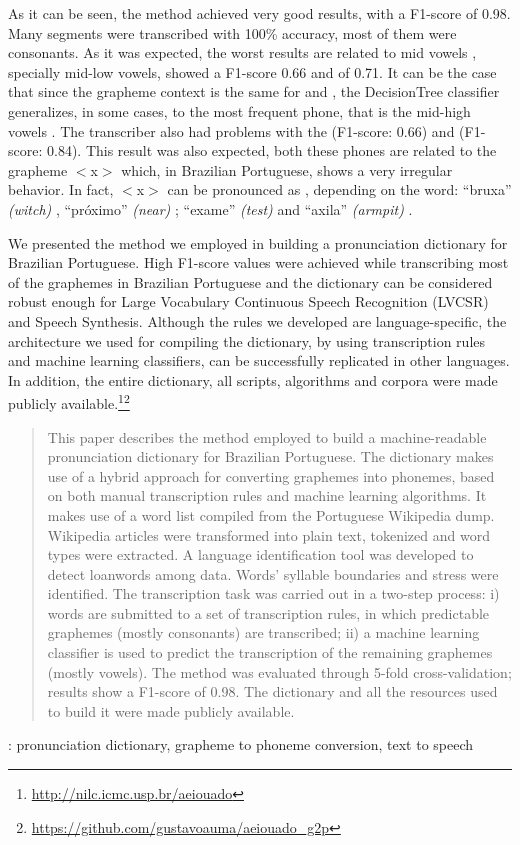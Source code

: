 As it can be seen, the method achieved very good results, with a F1-score of 0.98. Many segments were transcribed with 100\% accuracy, most of them were consonants. As it was expected, the worst results are related to mid vowels \textipa{[E, e, O, o]}, specially mid-low vowels, \textipa{[E]} showed a F1-score 0.66 and \textipa{[O]} of 0.71. It can be the case that since the grapheme context is the same for \textipa{[E, e]} and \textipa{[O, o]}, the DecisionTree classifier generalizes, in some cases, to the most frequent phone, that is the mid-high vowels \textipa{[e,o]}. The transcriber also had problems with the \textipa{[k.s]} (F1-score: 0.66) and \textipa{[S]} (F1-score: 0.84). This result was also expected, both these phones are related to the grapheme $<$x$>$ which, in Brazilian Portuguese, shows a very irregular behavior. In fact, $<$x$>$ can be pronounced as \textipa{[S, s, z, k.s]}, depending on the  word:  ``bruxa'' \emph{(witch)} \textipa{[S]}, ``pr\'oximo'' \emph{(near)} \textipa{[s]};  ``exame'' \emph{(test)} \textipa{[z]} and ``axila'' \emph{(armpit)} \textipa{[k.s]}.

We presented the method we employed in building a pronunciation dictionary for Brazilian Portuguese. High F1-score values were achieved while transcribing most of the graphemes in Brazilian Portuguese and the dictionary can be considered robust enough for Large Vocabulary Continuous Speech Recognition (LVCSR) and Speech Synthesis. Although the rules we developed are language-specific, the architecture we used for compiling the dictionary, by using transcription rules and machine learning classifiers, can be successfully replicated in other languages. In addition, the entire dictionary, all scripts, algorithms and corpora were made publicly available.\footnote{\url{http://nilc.icmc.usp.br/aeiouado}}\footnote{\url{https://github.com/gustavoauma/aeiouado_g2p}}

\clearpage


\begin{abstract}
This paper describes the method employed to build a machine-readable 
pronunciation 
dictionary for Brazilian Portuguese. The dictionary makes use of a hybrid approach for
converting graphemes into phonemes, based on both manual transcription rules and machine
learning algorithms. It makes use of a word list compiled from the Portuguese
Wikipedia dump. Wikipedia articles were transformed into plain text, tokenized and 
word types were extracted. A language identification tool was developed to detect 
loanwords among data. Words' syllable boundaries and stress were identified.
The transcription task was carried out in a two-step process: i) words are submitted
to a set of transcription rules, in which predictable graphemes (mostly consonants)
are transcribed; ii) a machine learning classifier is used to predict the transcription of the 
remaining graphemes (mostly vowels). The method was evaluated through 5-fold cross-validation; 
results show a F1-score of 0.98. The dictionary and all the resources used to build it 
were made publicly available.

\end{abstract}
: pronunciation dictionary, grapheme to phoneme conversion, text to speech


